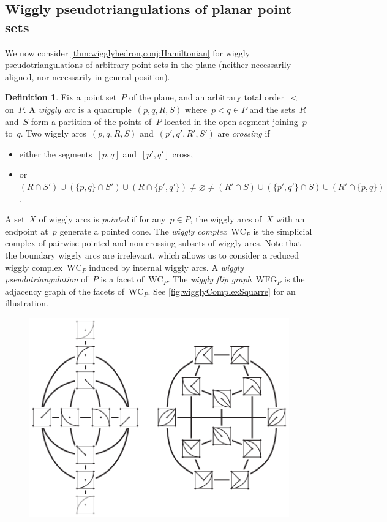 \documentclass{amsart}
\theoremstyle{definition}
\newtheorem{definition}[theorem]{Definition}
\newcommand{\darkblue}{\color{darkblue}} %
\newcommand{\defn}[1]{\textsl{\darkblue #1}} %
\newcommand{\wigglyComplex}{\mathrm{WC}} %
\newcommand{\wigglyFlipGraph}{\mathrm{WFG}} %
\begin{document}

\subsection{Wiggly pseudotriangulations of planar point sets}
\label{subsec:planarPointSets}

We now consider \cref{thm:wigglyhedron,conj:Hamiltonian} for wiggly pseudotriangulations of arbitrary point sets in the plane (neither necessarily aligned, nor necessarily in general position).

\begin{definition}
\label{def:wigglyComplexPointSet}
Fix a point set~$P$ of the plane, and an arbitrary total order~$<$ on~$P$.
A \defn{wiggly arc} is a quadruple~$(p,q,R,S)$ where~$p < q \in P$ and the sets~$R$ and~$S$ form a partition of the points of~$P$ located in the open segment joining~$p$ to~$q$.
Two wiggly arcs~$(p,q,R,S)$ and~$(p',q',R',S')$ are \defn{crossing} if 
\begin{itemize}
\item either the segments~$[p,q]$ and~$[p',q']$ cross, 
\item or~$(R \cap S') \cup (\{p,q\} \cap S') \cup (R \cap \{p',q'\}) \ne \varnothing \ne (R' \cap S) \cup (\{p',q'\} \cap S) \cup (R' \cap \{p,q\})$.
\end{itemize}
A set~$X$ of wiggly arcs is \defn{pointed} if for any~$p \in P$, the wiggly arcs of~$X$ with an endpoint at~$p$ generate a pointed cone.
The \defn{wiggly complex}~$\wigglyComplex_P$ is the simplicial complex of pairwise pointed and non-crossing subsets of wiggly arcs.
Note that the boundary wiggly arcs are irrelevant, which allows us to consider a reduced wiggly complex~$\wigglyComplex_P$ induced by internal wiggly arcs.
A \defn{wiggly pseudotriangulation} of~$P$ is a facet of~$\wigglyComplex_P$.
The \defn{wiggly flip graph}~$\wigglyFlipGraph_P$ is the adjacency graph of the facets of~$\wigglyComplex_P$.
See \cref{fig:wigglyComplexSquarre} for an illustration.
%
\begin{figure}[!h]
\centerline{\includegraphics[scale=1]{wigglyComplexSquare}}

\end{figure}
\end{definition}
\end{document}
